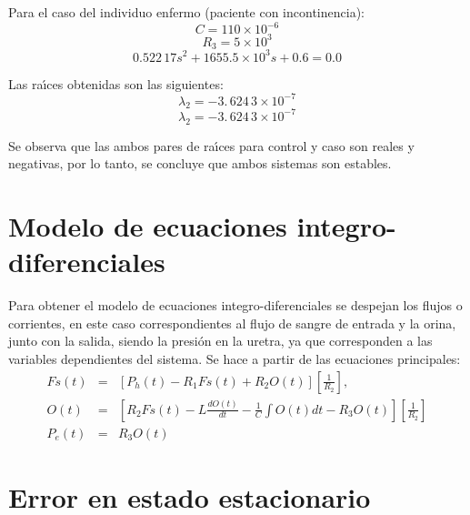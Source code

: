 \documentclass[letterpaper,11pt]{article}
\begin{document}
Para el caso del individuo enfermo (paciente con incontinencia):%
\begin{equation*}
C=110\times 10^{-6}
\end{equation*}%
\begin{equation*}
R_{3}=5\times 10^{3}
\end{equation*}%
\begin{equation*}
0.522\,17s^{2}+1655.5\times 10^{3}s+0.6=0.0
\end{equation*}

Las ra\'{\i}ces obtenidas son las siguientes:%
\begin{equation*}
\lambda _{2}=-3.\,\allowbreak 624\,3\times 10^{-7}
\end{equation*}%
\begin{equation*}
\lambda _{2}=-3.\,\allowbreak 624\,3\times 10^{-7}
\end{equation*}

Se observa que las ambos pares de ra\'{\i}ces para control y caso son reales
y negativas, por lo tanto, se concluye que ambos sistemas son estables.

\section{Modelo de ecuaciones integro-diferenciales}

Para obtener el modelo de ecuaciones integro-diferenciales se despejan los
flujos o corrientes, en este caso correspondientes al flujo de sangre de
entrada y la orina, junto con la salida, siendo la presi\'{o}n en la uretra,
ya que corresponden a las variables dependientes del sistema. Se hace a
partir de las ecuaciones principales:%
\begin{eqnarray*}
Fs(t) &=&\left[ P_{h}(t)-R_{1}Fs(t)+R_{2}O(t)\right] \left[ \frac{1}{R_{2}}%
\right] , \\
O(t) &=&\left[ R_{2}Fs(t)-L\frac{dO(t)}{dt}-\frac{1}{C}\int O(t)dt-R_{3}O(t)%
\right] \left[ \frac{1}{R_{2}}\right]  \\
P_{e}(t) &=&R_{3}O(t)
\end{eqnarray*}

\section{Error en estado estacionario}
\end{document}
